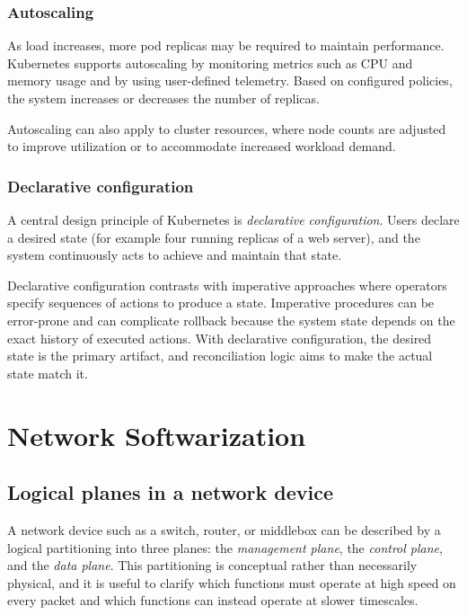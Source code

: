 \documentclass[11pt,a4paper,openany]{report}
\begin{document}
\subsection{Autoscaling}

As load increases, more pod replicas may be required to maintain performance. Kubernetes supports autoscaling by monitoring metrics such as CPU and memory usage and by using user-defined telemetry. Based on configured policies, the system increases or decreases the number of replicas.

Autoscaling can also apply to cluster resources, where node counts are adjusted to improve utilization or to accommodate increased workload demand.

\subsection{Declarative configuration}

A central design principle of Kubernetes is \emph{declarative configuration}. Users declare a desired state (for example four running replicas of a web server), and the system continuously acts to achieve and maintain that state.

Declarative configuration contrasts with imperative approaches where operators specify sequences of actions to produce a state. Imperative procedures can be error-prone and can complicate rollback because the system state depends on the exact history of executed actions. With declarative configuration, the desired state is the primary artifact, and reconciliation logic aims to make the actual state match it.

\chapter{Network Softwarization}

\section{Logical planes in a network device}

A network device such as a switch, router, or middlebox can be described by a logical partitioning into three planes: the \emph{management plane}, the \emph{control plane}, and the \emph{data plane}. This partitioning is conceptual rather than necessarily physical, and it is useful to clarify which functions must operate at high speed on every packet and which functions can instead operate at slower timescales.
\end{document}
